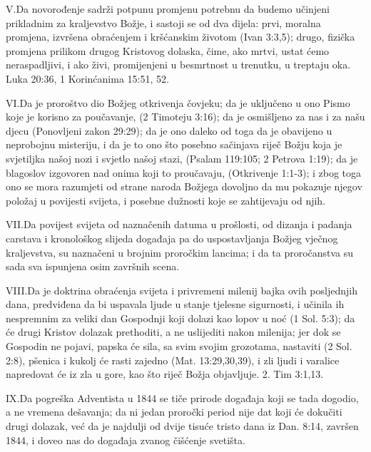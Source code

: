 \lettrine{V.} Da novorođenje sadrži potpunu promjenu potrebnu da budemo učinjeni prikladnim za kraljevstvo Božje, i sastoji se od dva dijela: prvi, moralna promjena, izvršena obraćenjem i kršćanskim životom (Ivan 3:3,5); drugo, fizička promjena prilikom drugog Kristovog dolaska, čime, ako mrtvi, ustat ćemo neraspadljivi, i ako živi, promijenjeni u besmrtnost u trenutku, u treptaju oka. Luka 20:36, 1 Korinćanima 15:51, 52.

\lettrine{VI.} Da je proroštvo dio Božjeg otkrivenja čovjeku; da je uključeno u ono Pismo koje je korisno za poučavanje, (2 Timoteju 3:16); da je osmišljeno za nas i za našu djecu (Ponovljeni zakon 29:29); da je ono daleko od toga da je obavijeno u neprobojnu misteriju, i da je to ono što posebno sačinjava riječ Božju koja je svjetiljka našoj nozi i svjetlo našoj stazi, (Psalam 119:105; 2 Petrova 1:19); da je blagoslov izgovoren nad onima koji to proučavaju, (Otkrivenje 1:1-3); i zbog toga ono se mora razumjeti od strane naroda Božjega dovoljno da mu pokazuje njegov položaj u povijesti svijeta, i posebne dužnosti koje se zahtijevaju od njih.

\lettrine{VII.} Da povijest svijeta od naznačenih datuma u prošlosti, od dizanja i padanja carstava i kronološkog slijeda događaja pa do uspostavljanja Božjeg vječnog kraljevstva, su naznačeni u brojnim proročkim lancima; i da ta proročanstva su sada sva ispunjena osim završnih scena.

\lettrine{VIII.} Da je doktrina obraćenja svijeta i privremeni milenij bajka ovih posljednjih dana, predviđena da bi uspavala ljude u stanje tjelesne sigurnosti, i učinila ih nespremnim za veliki dan Gospodnji koji dolazi kao lopov u noć (1 Sol. 5:3); da će drugi Kristov dolazak prethoditi, a ne uslijediti nakon milenija; jer dok se Gospodin ne pojavi, papska će sila, sa svim svojim grozotama, nastaviti (2 Sol. 2:8), pšenica i kukolj će rasti zajedno (Mat. 13:29,30,39), i zli ljudi i varalice napredovat će iz zla u gore, kao što riječ Božja objavljuje. 2. Tim 3:1,13.

\lettrine{IX.} Da pogreška Adventista u 1844 se tiče prirode događaja koji se tada dogodio, a ne vremena dešavanja; da ni jedan proročki period nije dat koji će dokučiti drugi dolazak, već da je najdulji od dvije tisuće tristo dana iz Dan. 8:14, završen 1844, i doveo nas do događaja zvanog čišćenje svetišta.

